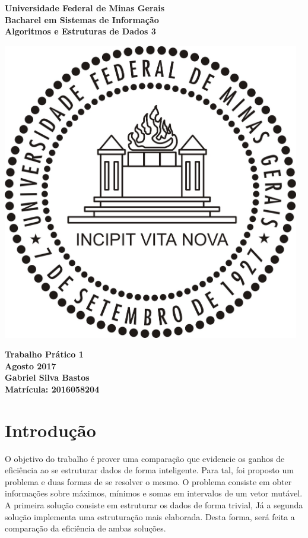 \documentclass{article}
\begin{document}
\begin{titlepage}
  \centering
  
  \vfill{
    \bfseries\Huge
    Universidade Federal de Minas Gerais\\[5pt]
    \bfseries\Large
    Bacharel em Sistemas de Informação \\
    Algoritmos e Estruturas de Dados 3\\
  }
  
  \vfill
  
  \includegraphics[width=13cm]{images/ufmg_logo.jpg}
  
  \vfill{
    \bfseries\Large
    Trabalho Prático 1\\
    Agosto 2017\\
  }
  \vfill{
    \bfseries\large
    Gabriel Silva Bastos\\[5pt]
    Matrícula: 2016058204
  }
\end{titlepage}


\section{Introdução}
O objetivo do trabalho é prover uma comparação que evidencie os ganhos de eficiência ao se estruturar dados de forma inteligente. Para tal, foi proposto um problema e duas formas de se resolver o mesmo. O problema consiste em obter informações sobre máximos, mínimos e somas em intervalos de um vetor mutável. A primeira solução consiste em estruturar os dados de forma trivial, Já a segunda solução implementa uma estruturação mais elaborada. Desta forma, será feita a comparação da eficiência de ambas soluções.
\end{document}
